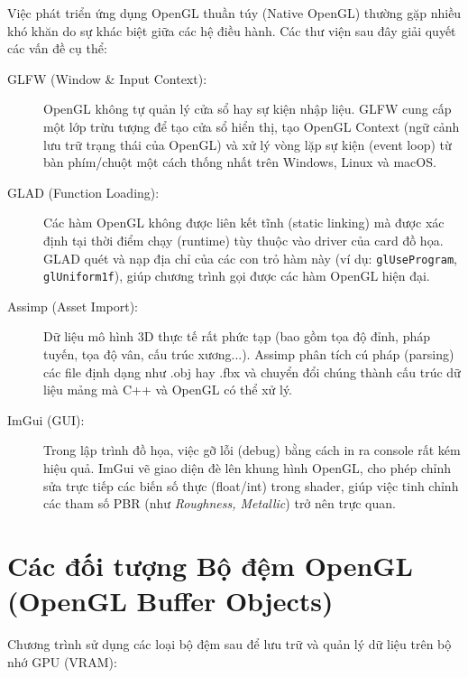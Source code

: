 Việc phát triển ứng dụng OpenGL thuần túy (Native OpenGL) thường gặp nhiều khó khăn do sự khác biệt giữa các hệ điều hành. Các thư viện sau đây giải quyết các vấn đề cụ thể:

\begin{description}
	\item[GLFW (Window \& Input Context):] OpenGL không tự quản lý cửa sổ hay sự kiện nhập liệu. GLFW cung cấp một lớp trừu tượng để tạo cửa sổ hiển thị, tạo OpenGL Context (ngữ cảnh lưu trữ trạng thái của OpenGL) và xử lý vòng lặp sự kiện (event loop) từ bàn phím/chuột một cách thống nhất trên Windows, Linux và macOS.
	\item[GLAD (Function Loading):] Các hàm OpenGL không được liên kết tĩnh (static linking) mà được xác định tại thời điểm chạy (runtime) tùy thuộc vào driver của card đồ họa. GLAD quét và nạp địa chỉ của các con trỏ hàm này (ví dụ: \texttt{glUseProgram}, \texttt{glUniform1f}), giúp chương trình gọi được các hàm OpenGL hiện đại.
	\item[Assimp (Asset Import):] Dữ liệu mô hình 3D thực tế rất phức tạp (bao gồm tọa độ đỉnh, pháp tuyến, tọa độ vân, cấu trúc xương...). Assimp phân tích cú pháp (parsing) các file định dạng như .obj hay .fbx và chuyển đổi chúng thành cấu trúc dữ liệu mảng mà C++ và OpenGL có thể xử lý.
	\item[ImGui (GUI):] Trong lập trình đồ họa, việc gỡ lỗi (debug) bằng cách in ra console rất kém hiệu quả. ImGui vẽ giao diện đè lên khung hình OpenGL, cho phép chỉnh sửa trực tiếp các biến số thực (float/int) trong shader, giúp việc tinh chỉnh các tham số PBR (như \textit{Roughness, Metallic}) trở nên trực quan.
\end{description}

\section{Các đối tượng Bộ đệm OpenGL (OpenGL Buffer Objects)}

Chương trình sử dụng các loại bộ đệm sau để lưu trữ và quản lý dữ liệu trên bộ nhớ GPU (VRAM):

